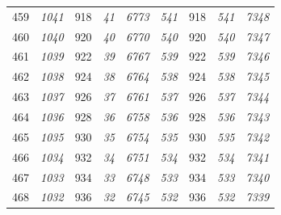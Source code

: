 \documentclass[10pt,fleqn]{article}
\begin{document}
\begin{longtable}{c|cccccccc}
459 & {\color{blue} \it 1041 \rm} & {\color{black} 918} & {\color{blue} \it 41 \rm} & {\color{blue} \it 6773 \rm} & {\color{blue} \it 541 \rm} & {\color{black} 918} & {\color{blue} \it 541 \rm} & {\color{blue} \it 7348 \rm} \\
460 & {\color{blue} \it 1040 \rm} & {\color{black} 920} & {\color{blue} \it 40 \rm} & {\color{blue} \it 6770 \rm} & {\color{blue} \it 540 \rm} & {\color{black} 920} & {\color{blue} \it 540 \rm} & {\color{blue} \it 7347 \rm} \\
461 & {\color{blue} \it 1039 \rm} & {\color{black} 922} & {\color{blue} \it 39 \rm} & {\color{blue} \it 6767 \rm} & {\color{blue} \it 539 \rm} & {\color{black} 922} & {\color{blue} \it 539 \rm} & {\color{blue} \it 7346 \rm} \\
462 & {\color{blue} \it 1038 \rm} & {\color{black} 924} & {\color{blue} \it 38 \rm} & {\color{blue} \it 6764 \rm} & {\color{blue} \it 538 \rm} & {\color{black} 924} & {\color{blue} \it 538 \rm} & {\color{blue} \it 7345 \rm} \\
463 & {\color{blue} \it 1037 \rm} & {\color{black} 926} & {\color{blue} \it 37 \rm} & {\color{blue} \it 6761 \rm} & {\color{blue} \it 537 \rm} & {\color{black} 926} & {\color{blue} \it 537 \rm} & {\color{blue} \it 7344 \rm} \\
464 & {\color{blue} \it 1036 \rm} & {\color{black} 928} & {\color{blue} \it 36 \rm} & {\color{blue} \it 6758 \rm} & {\color{blue} \it 536 \rm} & {\color{black} 928} & {\color{blue} \it 536 \rm} & {\color{blue} \it 7343 \rm} \\
465 & {\color{blue} \it 1035 \rm} & {\color{black} 930} & {\color{blue} \it 35 \rm} & {\color{blue} \it 6754 \rm} & {\color{blue} \it 535 \rm} & {\color{black} 930} & {\color{blue} \it 535 \rm} & {\color{blue} \it 7342 \rm} \\
466 & {\color{blue} \it 1034 \rm} & {\color{black} 932} & {\color{blue} \it 34 \rm} & {\color{blue} \it 6751 \rm} & {\color{blue} \it 534 \rm} & {\color{black} 932} & {\color{blue} \it 534 \rm} & {\color{blue} \it 7341 \rm} \\
467 & {\color{blue} \it 1033 \rm} & {\color{black} 934} & {\color{blue} \it 33 \rm} & {\color{blue} \it 6748 \rm} & {\color{blue} \it 533 \rm} & {\color{black} 934} & {\color{blue} \it 533 \rm} & {\color{blue} \it 7340 \rm} \\
468 & {\color{blue} \it 1032 \rm} & {\color{black} 936} & {\color{blue} \it 32 \rm} & {\color{blue} \it 6745 \rm} & {\color{blue} \it 532 \rm} & {\color{black} 936} & {\color{blue} \it 532 \rm} & {\color{blue} \it 7339 \rm} \\

\end{longtable}
\end{document}
